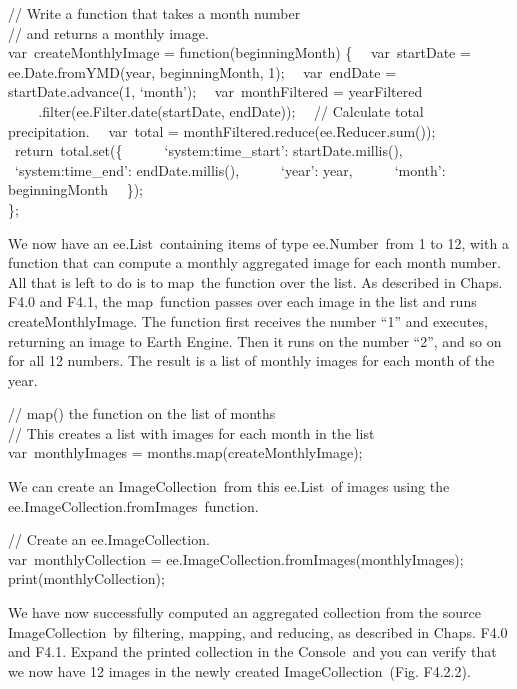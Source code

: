 \documentclass[
  letterpaper,
  DIV=11,
  numbers=noendperiod]{scrreprt}
\begin{document}
// Write a function that takes a month number\\
// and returns a monthly image.\\
var~createMonthlyImage = function(beginningMonth) \{~ ~var~startDate =
ee.Date.fromYMD(year, beginningMonth, 1);~ ~var~endDate =
startDate.advance(1, `month');~ ~var~monthFiltered = yearFiltered\\
\hspace*{0.333em} ~ ~ ~.filter(ee.Filter.date(startDate, endDate));~ ~//
Calculate total precipitation.~ ~var~total =
monthFiltered.reduce(ee.Reducer.sum());~ ~return~total.set(\{~ ~ ~
~`system:time\_start': startDate.millis(),~ ~ ~ ~`system:time\_end':
endDate.millis(),~ ~ ~ ~`year': year,~ ~ ~ ~`month': beginningMonth~
~\});\\
\};

We now have an ee.List~containing items of type ee.Number~from 1 to 12,
with a function that can compute a monthly aggregated image for each
month number. All that is left to do is to map~the function over the
list. As described in Chaps. F4.0 and F4.1, the map~function passes over
each image in the list and runs createMonthlyImage. The function first
receives the number ``1'' and executes, returning an image to Earth
Engine. Then it runs on the number ``2'', and so on for all 12 numbers.
The result is a list of monthly images for each month of the year.

// map() the function on the list of months\\
// This creates a list with images for each month in the list\\
var~monthlyImages = months.map(createMonthlyImage);

We can create an ImageCollection~from this ee.List~of images using the
ee.ImageCollection.fromImages~function.

// Create an ee.ImageCollection.\\
var~monthlyCollection = ee.ImageCollection.fromImages(monthlyImages);\\
print(monthlyCollection);

We have now successfully computed an aggregated collection from the
source ImageCollection~by filtering, mapping, and reducing, as described
in Chaps. F4.0 and F4.1. Expand the printed collection in the
Console~and you can verify that we now have 12 images in the newly
created ImageCollection~(Fig. F4.2.2).
\end{document}
